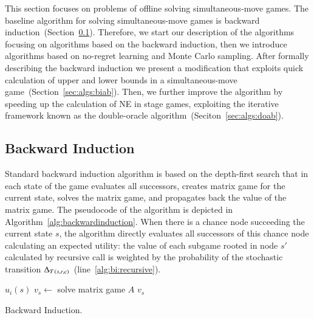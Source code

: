 This section focuses on problems of offline solving simultaneous-move games. 
The baseline algorithm for solving simultaneous-move games is backward induction~(Section~\ref{sec:algs:bi}).
Therefore, we start our description of the algorithms focusing on algorithms based on the backward induction, then we introduce algorithms based on no-regret learning and Monte Carlo sampling.
After formally describing the backward induction we present a modification that exploits quick calculation of upper and lower bounds in a simultaneous-move game~(Section~\ref{sec:algs:biab}).
Then, we further improve the algorithm by speeding up the calculation of NE in stage games, exploiting the iterative framework known as the double-oracle algorithm~(Seciton~\ref{sec:algs:doab}).

\subsection{Backward Induction}\label{sec:algs:bi}
Standard backward induction algorithm is based on the depth-first search that in each state of the game evaluates all successors, creates matrix game for the current state, solves the matrix game, and propagates back the value of the matrix game. The pseudocode of the algorithm is depicted in Algorithm~\ref{alg:backwardinduction}. When there is a chance node succeeding the current state $s$, the algorithm directly evaluates all successors of this chance node calculating an expected utility: the value of each subgame rooted in node $s'$ calculated by recursive call is weighted by the probability of the stochastic transition $\Delta_{\mathcal{T}(s,r,c)}$~(line~\ref{alg:bi:recursive}).

\begin{algorithm2e}[t]
\small
{}
 {\Return $u_i(s)$} \label{alg:bi:stop1}
$v_s \leftarrow$ solve matrix game $A$\;
\Return $v_s$ \label{alg:bi:stop2}
\caption{Backward Induction.}\label{alg:backwardinduction}
\end{algorithm2e}

